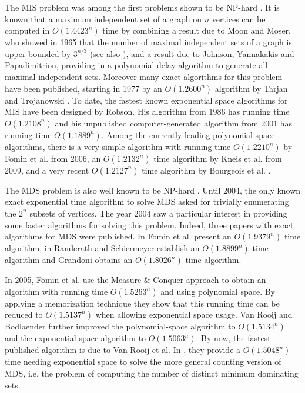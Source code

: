 \documentclass[a4paper,10pt]{article}
\theoremstyle{plain}
\theoremstyle{definition}
\theoremstyle{remark}
\newcommand{\MISpb}{\textsc{MIS}\xspace}
\newcommand{\MDSpb}{\textsc{MDS}\xspace}
\begin{document}
\smallskip

The \MISpb problem was among the first problems shown to be NP-hard \cite{GareyJ79}.
It is known that a maximum independent set of a graph on $n$ vertices can be computed in $O(1.4423^n)$ time
by combining a result due to Moon and Moser, who showed in 1965 
that the number of maximal independent sets of a graph is upper
bounded by $3^{n/3}$ \cite{MoonMoser} (see also \cite{MillerM60}), and a result due to Johnson, Yannakakis and Papadimitriou,
providing in \cite{Johnson} a polynomial delay algorithm to generate all maximal
independent sets.
Moreover many exact algorithms for this problem have been published, starting
in 1977 by an $O(1.2600^n)$ algorithm by Tarjan and Trojanowski \cite{Tarjan}.
To date, the fastest known exponential space algorithms for \MISpb have been
designed by Robson. His algorithm from 1986 \cite{Robson} has running time $O(1.2108^n)$ and
his unpublished computer-generated algorithm from 2001 \cite{RobsonTR} has
running time $O(1.1889^n)$.
Among the currently leading polynomial space algorithms, there is a very simple algorithm with running
time $O(1.2210^n)$ by Fomin et al. \cite{soda2006,AcmFGK} from 2006,
an $O(1.2132^n)$ time algorithm by Kneis et al. \cite{KneisFSTTCS2009} from 2009,
and a very recent $O(1.2127^n)$ time algorithm by Bourgeois et al. \cite{BourgeoisSWAT2010}.

\smallskip

The \MDSpb problem
is also well known to be NP-hard \cite{GareyJ79}.
Until 2004, the only known exact exponential time algorithm to solve \MDSpb
asked for trivially enumerating the $2^n$ subsets of vertices. The year 2004 saw a particular
interest in providing some faster algorithms for solving
this problem. Indeed, three papers with exact algorithms for \MDSpb were published.
In \cite{WG2004} Fomin et al. present an $O(1.9379^n)$ time algorithm, in
\cite{Randerath} Randerath and Schiermeyer establish an $O(1.8899^n)$ time algorithm
and Grandoni \cite{Grandoni} obtains an $O(1.8026^n)$ time algorithm.

In 2005, Fomin et al. \cite{icalp2005,AcmFGK} use the Measure \& Conquer approach to obtain an algorithm with
running time $O(1.5263^n)$
and using polynomial space. By applying a memorization technique they show that this running
time can be reduced to $O(1.5137^n)$ when allowing exponential space usage.
Van Rooij and Bodlaender \cite{vanRooijSTACS2008} further improved the polynomial-space algorithm
to $O(1.5134^n)$ and the exponential-space algorithm to $O(1.5063^n)$.
By now, the fastest published algorithm is due to Van Rooij et al. In \cite{vanRooijESA2009}, they provide
a $O(1.5048^n)$ time needing exponential space to solve the more general counting version of \MDSpb, 
i.e. the problem of computing the number of distinct minimum dominating sets.
\end{document}

